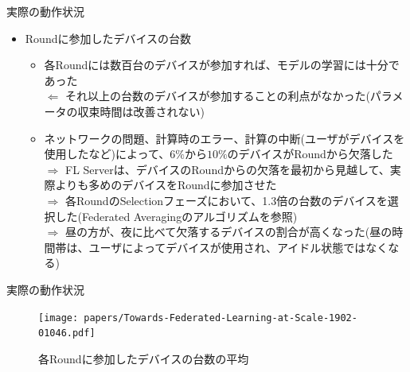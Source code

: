 \documentclass[dvipdfmx,notheorems,t]{beamer}
\begin{document}
\begin{frame}{実際の動作状況}

\begin{itemize}
	\item Roundに参加したデバイスの台数
	\begin{itemize}
		\item 各Roundには数百台のデバイスが参加すれば、モデルの学習には十分であった \\
		$\Leftarrow$ それ以上の台数のデバイスが参加することの利点がなかった(パラメータの収束時間は改善されない)
		\newline
		
		\item ネットワークの問題、計算時のエラー、計算の中断(ユーザがデバイスを使用したなど)によって、$6\%$から$10\%$のデバイスがRoundから欠落した \\
		$\Rightarrow$ FL Serverは、デバイスのRoundからの欠落を最初から見越して、実際よりも多めのデバイスをRoundに参加させた \\
		$\Rightarrow$ 各RoundのSelectionフェーズにおいて、1.3倍の台数のデバイスを選択した(Federated Averagingのアルゴリズムを参照) \\
		$\Rightarrow$ 昼の方が、夜に比べて欠落するデバイスの割合が高くなった(昼の時間帯は、ユーザによってデバイスが使用され、アイドル状態ではなくなる)
	\end{itemize}
\end{itemize}

\end{frame}

\begin{frame}{実際の動作状況}

\begin{figure}
	\centering
	\texttt{[image: papers/Towards-Federated-Learning-at-Scale-1902-01046.pdf]}
	\caption{各Roundに参加したデバイスの台数の平均~\cite{DBLP:journals/corr/abs-1902-01046}}
	\label{fig:devices-per-round}
\end{figure}

\end{frame}
\end{document}
